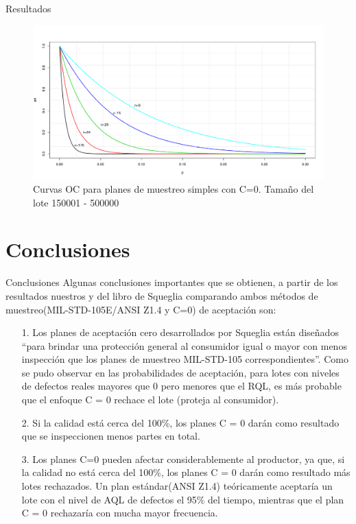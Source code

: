 \documentclass[10pt]{beamer}
\begin{document}
\begin{frame}{Resultados}
\begin{figure}[h!]
  \centering
  \includegraphics[scale=0.33]{FigurasUV/CO14.pdf}
  \caption{Curvas OC para planes de muestreo simples con C=0. Tamaño del lote 150001 - 500000}
\end{figure}
\end{frame}


\section{Conclusiones}
\begin{frame}{Conclusiones}
Algunas conclusiones importantes que se obtienen, a partir de los resultados nuestros y del libro de Squeglia comparando ambos métodos de muestreo(MIL-STD-105E/ANSI Z1.4 y C=0) de aceptación son:
\begin{itemize}
\item[1.]Los planes de aceptación cero desarrollados por Squeglia están diseñados ``para brindar una protección general al consumidor igual o mayor con menos inspección que los planes de muestreo MIL-STD-105 correspondientes''. Como se pudo observar en las probabilidades de aceptación, para lotes con niveles de defectos reales mayores que 0 pero menores que el RQL, es más probable que el enfoque C = 0 rechace el lote (proteja al consumidor).

\item[2.]Si la calidad está cerca del 100\%, los planes C = 0 darán como resultado que se inspeccionen menos partes en total.

\item[3.]Los planes C=0 pueden afectar considerablemente al productor, ya que, si la calidad no está cerca del 100\%, los planes C = 0 darán como resultado más lotes rechazados. Un plan estándar(ANSI Z1.4) teóricamente aceptaría un lote con el nivel de AQL de defectos el 95\% del tiempo, mientras que el plan C = 0 rechazaría con mucha mayor frecuencia.
\end{itemize}
\end{frame}
\end{document}
